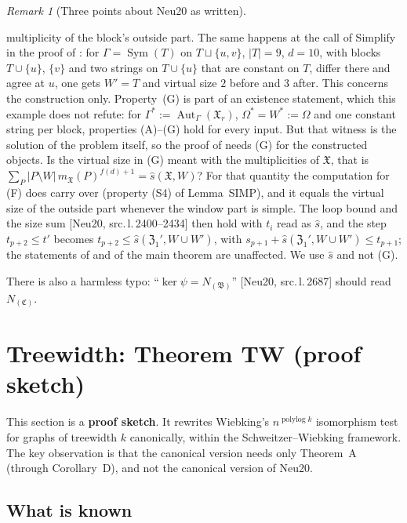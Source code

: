 \documentclass[11pt]{article}
\theoremstyle{plain}
\theoremstyle{definition}
\theoremstyle{remark}
\newtheorem{remark}[theorem]{Remark}
\theoremstyle{named}
\theoremstyle{namedrm}
\newcommand{\Sym}{\operatorname{Sym}}
\newcommand{\Aut}{\operatorname{Aut}}
\newcommand{\polylog}{\operatorname{polylog}}
\newcommand{\fX}{\mathfrak{X}}
\newcommand{\src}[2]{[#1, src.\,l.\,#2]}
\begin{document}
\begin{remark}[Three points about Neu20 as written]
\begin{enumerate}
  multiplicity of the block's outside part. The same happens at the call of Simplify in the proof of \cite[Thm.~4.24]{Neu20}: for $\Gamma=\Sym(T)$ on $T\sqcup\{u,v\}$, $|T|=9$, $d=10$, with blocks $T\cup\{u\}$, $\{v\}$ and two strings on $T\cup\{u\}$ that are constant on $T$, differ there and agree at $u$, one gets $W'=T$ and virtual size $2$ before and $3$ after. This concerns the construction only. Property~(G) is part of an existence statement, which this example does not refute: for $\Gamma^*:=\Aut_\Gamma(\fX_r)$, $\Omega^*=W^*:=\Omega$ and one constant string per block, properties (A)--(G) hold for every input. But that witness is the solution of the problem itself, so the proof of \cite[Thm.~4.24]{Neu20} needs (G) for the constructed objects. Is the virtual size in (G) meant with the multiplicities of $\fX$, that is $\sum_P|P\setminus W|\,m_\fX(P)^{f(d)+1}=\widehat s(\fX,W)$? For that quantity the computation for (F) does carry over (property (S4) of Lemma~SIMP), and it equals the virtual size of the outside part whenever the window part is simple. The loop bound and the size sum \src{Neu20}{2400--2434} then hold with $t_i$ read as $\widehat s$, and the step $t_{p+2}\le t'$ becomes $t_{p+2}\le\widehat s(\mathfrak Z_1',W\cup W')$, with $s_{p+1}+\widehat s(\mathfrak Z_1',W\cup W')\le t_{p+1}$; the statements of \cite[Thm.~4.24]{Neu20} and of the main theorem are unaffected. We use $\widehat s$ and not (G).
\end{enumerate}
There is also a harmless typo: ``$\ker\psi=N_{(\mathfrak B)}$'' \src{Neu20}{2687} should read $N_{(\mathfrak C)}$.
\end{remark}

\section{Treewidth: Theorem TW (proof sketch)}\label{sec:TW}

This section is a \textbf{proof sketch}. It rewrites Wiebking's $n^{\polylog k}$ isomorphism test for graphs of
treewidth $k$ \cite[Thm.~35]{Wie20} canonically, within the Schweitzer--Wiebking framework. The key
observation is that the canonical version needs only Theorem~A (through Corollary~D), and not the
canonical version of Neu20.

\subsection{What is known}
\end{document}
